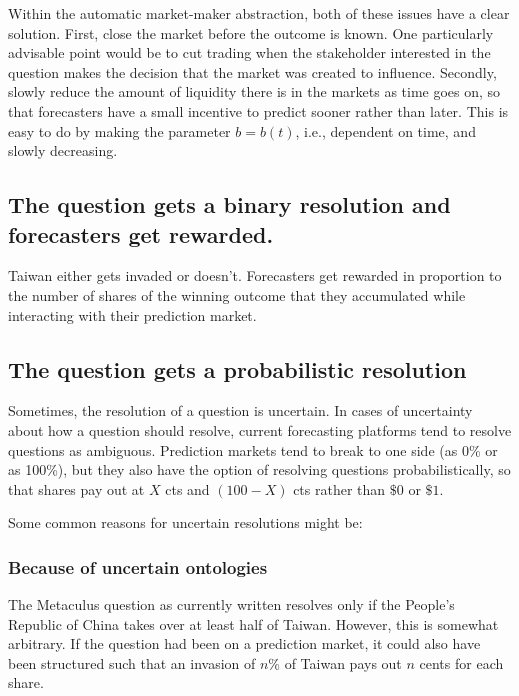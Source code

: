 \documentclass[]{article}
\begin{document}
Within the automatic market-maker abstraction, both of these issues have
a clear solution. First, close the market before the outcome is known.
One particularly advisable point would be to cut trading when the
stakeholder interested in the question makes the decision that the
market was created to influence. Secondly, slowly reduce the amount of
liquidity there is in the markets as time goes on, so that forecasters
have a small incentive to predict sooner rather than later. This is easy
to do by making the parameter \(b=b(t)\), i.e., dependent on time, and
slowly decreasing.

\hypertarget{the-question-gets-a-binary-resolution-and-forecasters-get-rewarded.}{%
\subsection{The question gets a binary resolution and forecasters get
rewarded.}\label{the-question-gets-a-binary-resolution-and-forecasters-get-rewarded.}}

Taiwan either gets invaded or doesn't. Forecasters get rewarded in
proportion to the number of shares of the winning outcome that they
accumulated while interacting with their prediction market.

\hypertarget{the-question-gets-a-probabilistic-resolution}{%
\subsection{The question gets a probabilistic
resolution}\label{the-question-gets-a-probabilistic-resolution}}

Sometimes, the resolution of a question is uncertain. In cases of
uncertainty about how a question should resolve, current forecasting
platforms tend to resolve questions as ambiguous. Prediction markets
tend to break to one side (as 0\% or as 100\%), but they also have the
option of resolving questions probabilistically, so that shares pay out
at \(X\) cts and \((100-X)\) cts rather than \(\$0\) or \(\$1\).

Some common reasons for uncertain resolutions might be:

\hypertarget{because-of-uncertain-ontologies}{%
\subsubsection{Because of uncertain
ontologies}\label{because-of-uncertain-ontologies}}

The Metaculus question as currently written resolves only if the
People's Republic of China takes over at least half of Taiwan. However,
this is somewhat arbitrary. If the question had been on a prediction
market, it could also have been structured such that an invasion of
\(n\)\% of Taiwan pays out \(n\) cents for each share.
\end{document}
